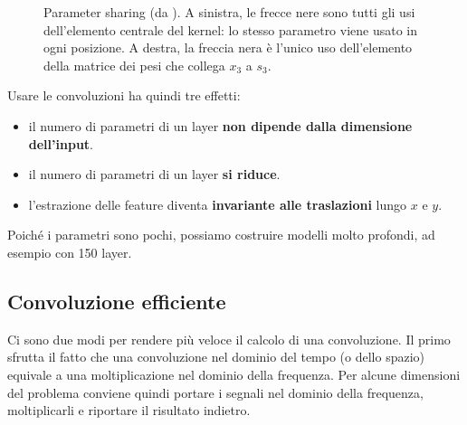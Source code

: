 \begin{figure}[htbp]
\centering
{}
\caption{Parameter sharing (da \cite{Goodfellow-et-al-2016}). A sinistra, le frecce nere sono tutti gli usi dell'elemento centrale del kernel: lo stesso parametro viene usato in ogni posizione. A destra, la freccia nera è l'unico uso dell'elemento della matrice dei pesi che collega $x_3$ a $s_3$.}
\label{fig:param-sharing}
\end{figure}

Usare le convoluzioni ha quindi tre effetti:
\begin{itemize}
    \item il numero di parametri di un layer \textbf{non dipende dalla dimensione dell'input}.
    \item il numero di parametri di un layer \textbf{si riduce}.
    \item l'estrazione delle feature diventa \textbf{invariante alle traslazioni} lungo $x$ e $y$.
\end{itemize}
Poiché i parametri sono pochi, possiamo costruire modelli molto profondi, ad esempio con 150 layer.

\subsection{Convoluzione efficiente}
Ci sono due modi per rendere più veloce il calcolo di una convoluzione. Il primo sfrutta il fatto che una convoluzione nel dominio del tempo (o dello spazio) equivale a una moltiplicazione nel dominio della frequenza. Per alcune dimensioni del problema conviene quindi portare i segnali nel dominio della frequenza, moltiplicarli e riportare il risultato indietro.


